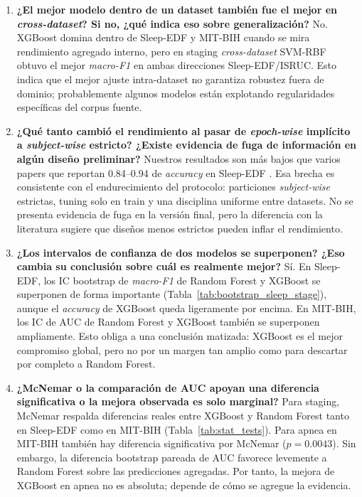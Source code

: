 \begin{enumerate}[leftmargin=*]
\item \textbf{¿El mejor modelo dentro de un dataset tambi\'en fue el mejor en \emph{cross-dataset}? Si no, ¿qu\'e indica eso sobre generalizaci\'on?} No. XGBoost domina dentro de Sleep-EDF y MIT-BIH cuando se mira rendimiento agregado interno, pero en staging \emph{cross-dataset} SVM-RBF obtuvo el mejor \emph{macro-F1} en ambas direcciones Sleep-EDF/ISRUC. Esto indica que el mejor ajuste intra-dataset no garantiza robustez fuera de dominio; probablemente algunos modelos est\'an explotando regularidades espec\'ificas del corpus fuente.

\item \textbf{¿Qu\'e tanto cambi\'o el rendimiento al pasar de \emph{epoch-wise} impl\'icito a \emph{subject-wise} estricto? ¿Existe evidencia de fuga de informaci\'on en alg\'un dise\~no preliminar?} Nuestros resultados son m\'as bajos que varios papers que reportan 0.84--0.94 de \emph{accuracy} en Sleep-EDF \cite{mousavi2019sleepeegnet,gao2023psdrf,nakamura2017complexity}. Esa brecha es consistente con el endurecimiento del protocolo: particiones \emph{subject-wise} estrictas, tuning solo en train y una disciplina uniforme entre datasets. No se presenta evidencia de fuga en la versi\'on final, pero la diferencia con la literatura sugiere que dise\~nos menos estrictos pueden inflar el rendimiento.

\item \textbf{¿Los intervalos de confianza de dos modelos se superponen? ¿Eso cambia su conclusi\'on sobre cu\'al es realmente mejor?} S\'i. En Sleep-EDF, los IC bootstrap de \emph{macro-F1} de Random Forest y XGBoost se superponen de forma importante (Tabla~\ref{tab:bootstrap_sleep_stage}), aunque el \emph{accuracy} de XGBoost queda ligeramente por encima. En MIT-BIH, los IC de AUC de Random Forest y XGBoost tambi\'en se superponen ampliamente. Esto obliga a una conclusi\'on matizada: XGBoost es el mejor compromiso global, pero no por un margen tan amplio como para descartar por completo a Random Forest.

\item \textbf{¿McNemar o la comparaci\'on de AUC apoyan una diferencia significativa o la mejora observada es solo marginal?} Para staging, McNemar respalda diferencias reales entre XGBoost y Random Forest tanto en Sleep-EDF como en MIT-BIH (Tabla~\ref{tab:stat_tests}). Para apnea en MIT-BIH tambi\'en hay diferencia significativa por McNemar (\(p=0.0043\)). Sin embargo, la diferencia bootstrap pareada de AUC favorece levemente a Random Forest sobre las predicciones agregadas. Por tanto, la mejora de XGBoost en apnea no es absoluta; depende de c\'omo se agregue la evidencia.


\end{enumerate}
